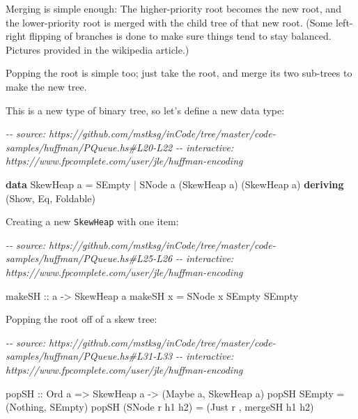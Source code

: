 \documentclass[]{article}
\newenvironment{Shaded}{}{}
\newcommand{\CommentTok}[1]{\textcolor[rgb]{0.38,0.63,0.69}{\textit{#1}}}
\newcommand{\DataTypeTok}[1]{\textcolor[rgb]{0.56,0.13,0.00}{#1}}
\newcommand{\KeywordTok}[1]{\textcolor[rgb]{0.00,0.44,0.13}{\textbf{#1}}}
\newcommand{\NormalTok}[1]{#1}
\newcommand{\OperatorTok}[1]{\textcolor[rgb]{0.40,0.40,0.40}{#1}}
\newcommand{\OtherTok}[1]{\textcolor[rgb]{0.00,0.44,0.13}{#1}}
\begin{document}
Merging is simple enough: The higher-priority root becomes the new root, and the
lower-priority root is merged with the child tree of that new root. (Some
left-right flipping of branches is done to make sure things tend to stay
balanced. Pictures provided in the wikipedia article.)

Popping the root is simple too; just take the root, and merge its two sub-trees
to make the new tree.

This is a new type of binary tree, so let's define a new data type:

\begin{Shaded}
\begin{Highlighting}[]
\CommentTok{{-}{-} source: https://github.com/mstksg/inCode/tree/master/code{-}samples/huffman/PQueue.hs\#L20{-}L22}
\CommentTok{{-}{-} interactive: https://www.fpcomplete.com/user/jle/huffman{-}encoding}

\KeywordTok{data} \DataTypeTok{SkewHeap}\NormalTok{ a }\OtherTok{=} \DataTypeTok{SEmpty}
                \OperatorTok{|} \DataTypeTok{SNode}\NormalTok{ a (}\DataTypeTok{SkewHeap}\NormalTok{ a) (}\DataTypeTok{SkewHeap}\NormalTok{ a)}
                \KeywordTok{deriving}\NormalTok{ (}\DataTypeTok{Show}\NormalTok{, }\DataTypeTok{Eq}\NormalTok{, }\DataTypeTok{Foldable}\NormalTok{)}
\end{Highlighting}
\end{Shaded}

Creating a new \texttt{SkewHeap} with one item:

\begin{Shaded}
\begin{Highlighting}[]
\CommentTok{{-}{-} source: https://github.com/mstksg/inCode/tree/master/code{-}samples/huffman/PQueue.hs\#L25{-}L26}
\CommentTok{{-}{-} interactive: https://www.fpcomplete.com/user/jle/huffman{-}encoding}

\OtherTok{makeSH ::}\NormalTok{ a }\OtherTok{{-}\textgreater{}} \DataTypeTok{SkewHeap}\NormalTok{ a}
\NormalTok{makeSH x }\OtherTok{=} \DataTypeTok{SNode}\NormalTok{ x }\DataTypeTok{SEmpty} \DataTypeTok{SEmpty}
\end{Highlighting}
\end{Shaded}

Popping the root off of a skew tree:

\begin{Shaded}
\begin{Highlighting}[]
\CommentTok{{-}{-} source: https://github.com/mstksg/inCode/tree/master/code{-}samples/huffman/PQueue.hs\#L31{-}L33}
\CommentTok{{-}{-} interactive: https://www.fpcomplete.com/user/jle/huffman{-}encoding}

\OtherTok{popSH ::} \DataTypeTok{Ord}\NormalTok{ a }\OtherTok{=\textgreater{}} \DataTypeTok{SkewHeap}\NormalTok{ a }\OtherTok{{-}\textgreater{}}\NormalTok{ (}\DataTypeTok{Maybe}\NormalTok{ a, }\DataTypeTok{SkewHeap}\NormalTok{ a)}
\NormalTok{popSH }\DataTypeTok{SEmpty}          \OtherTok{=}\NormalTok{ (}\DataTypeTok{Nothing}\NormalTok{, }\DataTypeTok{SEmpty}\NormalTok{)}
\NormalTok{popSH (}\DataTypeTok{SNode}\NormalTok{ r h1 h2) }\OtherTok{=}\NormalTok{ (}\DataTypeTok{Just}\NormalTok{ r , mergeSH h1 h2)}
\end{Highlighting}
\end{Shaded}
\end{document}
